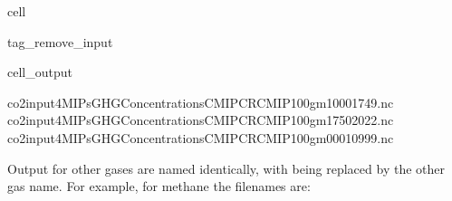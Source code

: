 \documentclass[letterpaper,10pt,english]{jupyterBook}
\begin{document}
\begin{sphinxuseclass}{cell}
\begin{sphinxuseclass}{tag_remove_input}\begin{sphinxVerbatimOutput}

\begin{sphinxuseclass}{cell_output}
\begin{sphinxVerbatim}[commandchars=\\\{\}]
\PYGZhy{} co2\PYGZus{}input4MIPs\PYGZus{}GHGConcentrations\PYGZus{}CMIP\PYGZus{}CR\PYGZhy{}CMIP\PYGZhy{}1\PYGZhy{}0\PYGZhy{}0\PYGZus{}gm\PYGZus{}1000\PYGZhy{}1749.nc
\PYGZhy{} co2\PYGZus{}input4MIPs\PYGZus{}GHGConcentrations\PYGZus{}CMIP\PYGZus{}CR\PYGZhy{}CMIP\PYGZhy{}1\PYGZhy{}0\PYGZhy{}0\PYGZus{}gm\PYGZus{}1750\PYGZhy{}2022.nc
\PYGZhy{} co2\PYGZus{}input4MIPs\PYGZus{}GHGConcentrations\PYGZus{}CMIP\PYGZus{}CR\PYGZhy{}CMIP\PYGZhy{}1\PYGZhy{}0\PYGZhy{}0\PYGZus{}gm\PYGZus{}0001\PYGZhy{}0999.nc
\end{sphinxVerbatim}

\end{sphinxuseclass}\end{sphinxVerbatimOutput}

\end{sphinxuseclass}
\end{sphinxuseclass}
\sphinxAtStartPar
Output for other gases are named identically,
with  being replaced by the other gas name.
For example, for methane the filenames are:
\end{document}

